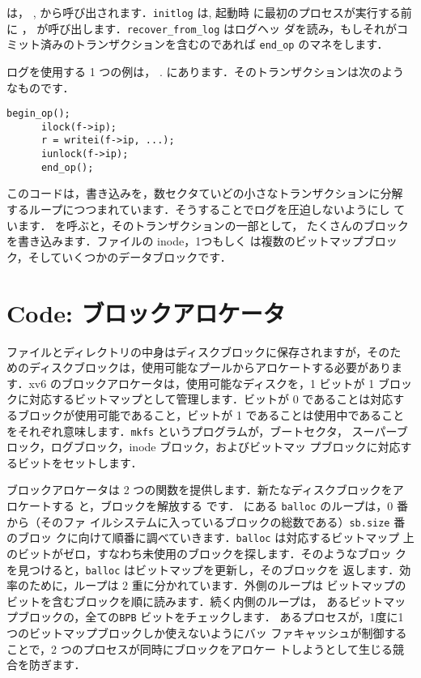 は，
,
から呼び出されます．\texttt{initlog} は, 起動時
に最初のプロセスが実行する前に ，
が呼び出します．\texttt{recover\_from\_log} はログヘッ
ダを読み，もしそれがコミット済みのトランザクションを含むのであれば
\texttt{end\_op} のマネをします．

ログを使用する 1 つの例は，
.
にあります．そのトランザクションは次のようなものです．
\begin{lstlisting}[]
      begin_op();
      ilock(f->ip);
      r = writei(f->ip, ...);
      iunlock(f->ip);
      end_op();
\end{lstlisting}
このコードは，書き込みを，数セクタていどの小さなトランザクションに分解
するループにつつまれています．そうすることでログを圧迫しないようにし
ています． を呼ぶと，そのトランザクションの一部として，
たくさんのブロックを書き込みます．ファイルの inode，1つもしく
は複数のビットマップブロック，そしていくつかのデータブロックです．

\section{Code: ブロックアロケータ}

ファイルとディレクトリの中身はディスクブロックに保存されますが，そのた
めのディスクブロックは，使用可能なプールからアロケートする必要がありま
す．xv6 のブロックアロケータは，使用可能なディスクを，1 ビットが 1 ブロッ
クに対応するビットマップとして管理します．ビットが 0 であることは対応す
るブロックが使用可能であること，ビットが 1 であることは使用中であること
をそれぞれ意味します．\texttt{mkfs} というプログラムが，ブートセクタ，
スーパーブロック，ログブロック，inode ブロック，およびビットマッ
プブロックに対応するビットをセットします．

ブロックアロケータは 2 つの関数を提供します．新たなディスクブロックをア
ロケートする  と，ブロックを解放する  です．
にある \texttt{balloc} のループは，0 番から（そのファ
イルシステムに入っているブロックの総数である）\texttt{sb.size} 番のブロッ
クに向けて順番に調べていきます．\texttt{balloc} は対応するビットマップ
上のビットがゼロ，すなわち未使用のブロックを探します．そのようなブロッ
クを見つけると，\texttt{balloc} はビットマップを更新し，そのブロックを
返します．効率のために，ループは 2 重に分かれています．外側のループは
ビットマップのビットを含むブロックを順に読みます．続く内側のループは，
あるビットマップブロックの，全ての\texttt{BPB} ビットをチェックします．
あるプロセスが，1度に1つのビットマップブロックしか使えないようにバッ
ファキャッシュが制御することで，2 つのプロセスが同時にブロックをアロケー
トしようとして生じる競合を防ぎます．

